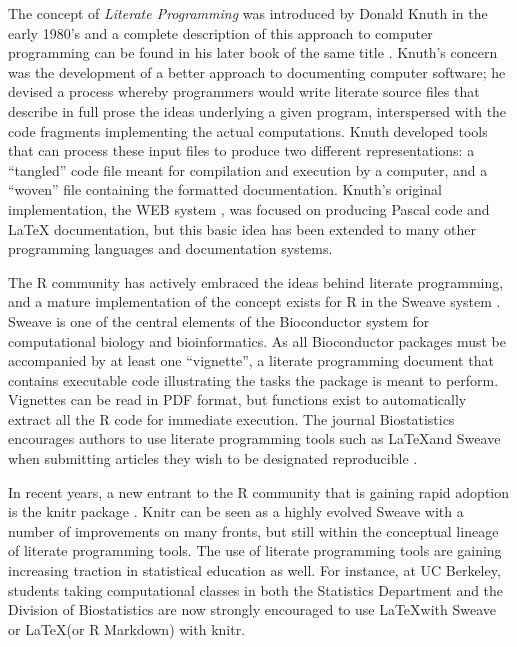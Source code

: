 \documentclass[ChapterTOCs,krantz2]{krantz} %
\theoremstyle{definition}
\begin{document}
The concept of \emph{Literate Programming} was introduced by Donald Knuth in
the early 1980's \cite{Knuth:1983:LP} and a complete description of this
approach to computer programming can be found in his later book of the same
title \cite{Knuth92}.  Knuth's concern was the development of a better approach
to documenting computer software; he devised a process whereby programmers
would write literate source files that describe in full prose the ideas
underlying a given program, interspersed with the code fragments implementing
the actual computations.  Knuth developed tools that can process these input
files to produce two different representations: a ``tangled'' code file meant
for compilation and execution by a computer, and a ``woven'' file containing
the formatted documentation.  Knuth's original implementation, the WEB system
\cite{Knuth:1983:WSS}, was focused on producing Pascal code and \LaTeX
documentation, but this basic idea has been extended to many other programming
languages and documentation systems.  

The R community has actively embraced the ideas behind literate programming,
and a mature implementation of the concept exists for R in the Sweave system
\cite{lmucs-papers:Leisch:2002}.  Sweave is one of the central elements of the
Bioconductor system \cite{Gentleman2004, Dudoit2003} for computational biology
and bioinformatics.  As all Bioconductor packages must be accompanied by at
least one ``vignette'', a literate programming document that contains
executable code illustrating the tasks the package is meant to perform.
Vignettes can be read in PDF format, but functions exist to automatically
extract all the R code for immediate execution.  The journal Biostatistics
encourages authors to use literate programming tools such as \LaTeX and Sweave
when submitting articles they wish to be designated reproducible \cite{Peng01072009}.

In recent years, a new entrant to the R community that is gaining rapid
adoption is the knitr package \cite{xie2012knitr}.  Knitr can be seen as a
highly evolved Sweave with a number of improvements on many fronts, but still
within the conceptual lineage of literate programming tools.  The use of
literate programming tools are gaining increasing traction in statistical
education as well.  For instance, at UC Berkeley, students taking computational
classes in both the Statistics Department and the Division of Biostatistics are
now strongly encouraged to use \LaTeX with Sweave or \LaTeX (or R Markdown) with 
knitr.
\end{document}
